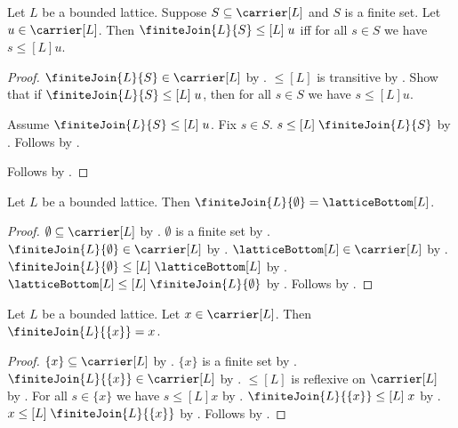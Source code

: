 \begin{proposition}\label{finite_join_leq_iff}
    Let $L$ be a bounded lattice.
    Suppose $S\subseteq\carrier[L]$ and $S$ is a finite set.
    Let $u\in\carrier[L]$.
    Then $\finiteJoin{L}{S}\mathrel{\leq[L]}u$ iff
        for all $s\in S$ we have $s\mathrel{\leq[L]}u$.
\end{proposition}
\begin{proof}
    $\finiteJoin{L}{S}\in\carrier[L]$ by .
    $\leq[L]$ is transitive by
        .
    Show that if $\finiteJoin{L}{S}\mathrel{\leq[L]}u$, then
        for all $s\in S$ we have $s\mathrel{\leq[L]}u$.
    \begin{subproof}
        Assume $\finiteJoin{L}{S}\mathrel{\leq[L]}u$.
        Fix $s\in S$.
        $s\mathrel{\leq[L]}\finiteJoin{L}{S}$ by
            .
        Follows by .
    \end{subproof}
    Follows by .
\end{proof}

\begin{proposition}\label{finite_join_empty}
    Let $L$ be a bounded lattice.
    Then $\finiteJoin{L}{\emptyset}=\latticeBottom[L]$.
\end{proposition}
\begin{proof}
    $\emptyset\subseteq\carrier[L]$ by .
    $\emptyset$ is a finite set by .
    $\finiteJoin{L}{\emptyset}\in\carrier[L]$ by
        .
    $\latticeBottom[L]\in\carrier[L]$ by .
    $\finiteJoin{L}{\emptyset}\mathrel{\leq[L]}\latticeBottom[L]$ by
        .
    $\latticeBottom[L]\mathrel{\leq[L]}\finiteJoin{L}{\emptyset}$ by
        .
    Follows by
        .
\end{proof}

\begin{proposition}\label{finite_join_singleton}
    Let $L$ be a bounded lattice.
    Let $x\in\carrier[L]$.
    Then $\finiteJoin{L}{\{x\}}=x$.
\end{proposition}
\begin{proof}
    $\{x\}\subseteq\carrier[L]$ by .
    $\{x\}$ is a finite set by .
    $\finiteJoin{L}{\{x\}}\in\carrier[L]$ by
        .
    $\leq[L]$ is reflexive on $\carrier[L]$ by
        .
    For all $s\in\{x\}$ we have $s\mathrel{\leq[L]}x$ by
        .
    $\finiteJoin{L}{\{x\}}\mathrel{\leq[L]}x$ by
        .
    $x\mathrel{\leq[L]}\finiteJoin{L}{\{x\}}$ by
        .
    Follows by
        .
\end{proof}

